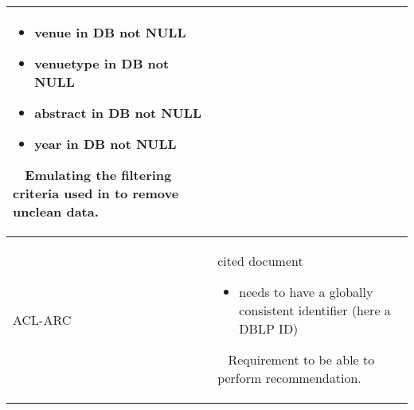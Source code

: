 \begin{table}[]
\begin{center}
\begin{tabular}{lp{11.5cm}}
\begin{itemize}
                \item venue in DB not NULL
                \item venuetype in DB not NULL
                \item abstract in DB not NULL
                \item year in DB not NULL
            \end{itemize}
            \ 
            \newline
            Emulating the filtering criteria used in \cite{Ebesu2017} to remove unclean data.\\
    \midrule
    ACL-ARC & cited document
            \begin{itemize}
                \item needs to have a globally consistent identifier (here a DBLP ID)
            \end{itemize}
            \ 
            \newline
            Requirement to be able to perform recommendation.\\
    \bottomrule
    \end{tabular}
\end{center}
\end{table}
